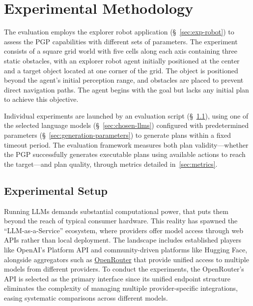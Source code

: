 \documentclass[12pt,a4paper,openright,twoside]{book}
\begin{document}
\section{Experimental Methodology}\label{sec:exp-methodology}

The evaluation employs the explorer robot application (\S~\ref{sec:exp-robot}) to assess the \ac{PGP} capabilities with different sets of parameters. 
%
The experiment consists of a square grid world with five cells along each axis containing three static obstacles, with an explorer robot agent initially positioned at the center and a target  object located at one corner of the grid.
%
The  object is positioned beyond the agent's initial perception range, and obstacles are placed to prevent direct navigation paths. 
%
The agent begins with the goal  but lacks any initial plan to achieve this objective. 

Individual experiments are launched by an evaluation script (\S~\ref{sec:exp-setup}), using one of the selected language models (\S~\ref{sec:chosen-llms}) configured with predetermined parameters (\S~\ref{sec:generation-parameters}) to generate plans within a fixed timeout period.
%
The evaluation framework measures both plan validity---whether the \ac{PGP} successfully generates executable plans using available actions to reach the target---and plan quality, through metrics detailed in~\cref{sec:metrics}. 

\subsection{Experimental Setup}\label{sec:exp-setup}

Running \acp{LLM} demands substantial computational power, that puts them beyond the reach of typical consumer hardware.
%
This reality has spawned the ``\ac{LLM}-as-a-Service'' ecosystem, where providers offer model access through web APIs rather than local deployment.
%
The landscape includes established players like OpenAI's Platform API and community-driven platforms like Hugging Face, alongside aggregators such as \href{https://openrouter.ai/}{OpenRouter} that provide unified access to multiple models from different providers. 
%
To conduct the experiments, the OpenRouter's API is selected as the primary interface since its unified endpoint structure eliminates the complexity of managing multiple provider-specific integrations, easing systematic comparisons across different models. 
\end{document}
